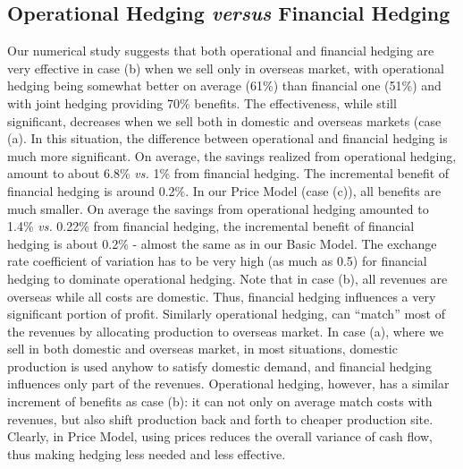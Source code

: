 \documentclass[mnsc,nonblindrev,copyedit]{informs2_wz} %
\newcommand{\OUT}[1]{}
\begin{document}





\subsection{Operational Hedging {\it versus} Financial Hedging}

Our numerical study suggests that both operational and financial hedging are very effective in case (b) when we sell only in overseas market, with operational hedging being somewhat better on average (61\%) than financial one (51\%) and with joint hedging providing 70\% benefits.  The effectiveness, while still significant, decreases when we sell both in domestic and overseas markets (case (a).  In this situation, the difference between operational and financial hedging is much more significant.  On average, the savings realized from operational hedging, amount to about 6.8\% {\it vs.} \hspace{-0.07in}1\% from financial hedging.  The incremental benefit of financial hedging is around 0.2\%.  In our Price Model (case (c)), all benefits are much smaller.  On average the savings from operational hedging amounted to 1.4\% {\it vs.} 0.22\% from financial hedging, the incremental benefit of financial hedging is about 0.2\% - almost the same as in our Basic Model.  The exchange rate coefficient of variation has to be very high (as much as 0.5) for financial hedging to dominate operational hedging.  Note that in case (b), all revenues are overseas while all costs are domestic.  Thus, financial hedging influences a very significant portion of profit.  Similarly operational hedging, can ``match'' most of the revenues by allocating production to overseas market.  In case (a), where we sell in both domestic and overseas market, in most situations, domestic production is used anyhow to satisfy domestic demand, and financial hedging influences only part of the revenues.  Operational hedging, however, has a similar increment of benefits as case (b): it can not only on average match costs with revenues, but also shift production back and forth to cheaper production site.  Clearly, in Price Model, using prices reduces the overall variance of cash flow, thus making hedging less needed and less effective.
\end{document}
